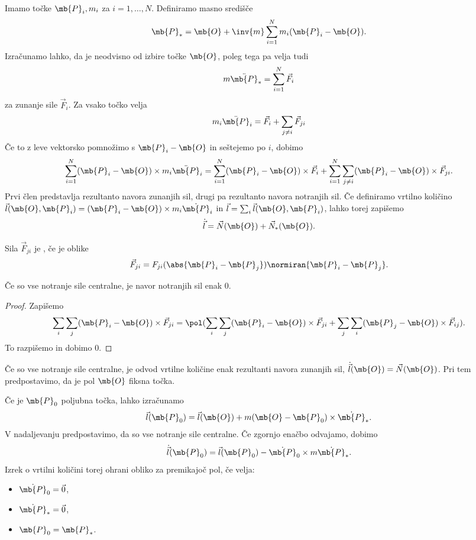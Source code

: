 
Imamo točke $\mb{P}_i, m_i$ za $i = 1, \ldots, N$.
Definiramo masno središče
\[
  \mb{P}_* = \mb{O} + \inv{m} \sum_{i=1}^N m_i (\mb{P}_i - \mb{O}).
\]
Izračunamo lahko, da je neodvisno od izbire točke $\mb{O}$, poleg tega pa velja
tudi
\[
  m \ddot{\mb{P}}_* = \sum_{i=1}^N \vec{F}_i
\]
za zunanje sile $\vec{F}_i$.
Za vsako točko velja
\[
  m_i \ddot{\mb{P}}_i = \vec{F}_i + \sum_{j \ne i} \vec{F}_{ji}
\]
Če to z leve vektorsko pomnožimo s $\mb{P}_i - \mb{O}$ in seštejemo po $i$,
dobimo
\[
  \sum_{i=1}^N (\mb{P}_i - \mb{O}) \times m_i \ddot{\mb{P}}_i
  = \sum_{i=1}^N (\mb{P}_i - \mb{O}) \times \vec{F}_i + \sum_{i=1}^N \sum_{j \ne
  i} (\mb{P}_i - \mb{O}) \times \vec{F}_{ji}.
\]
Prvi člen predstavlja rezultanto navora zunanjih sil, drugi pa rezultanto navora
notranjih sil.
Če definiramo vrtilno količino $\vec{l}(\mb{O}, \mb{P}_i) = (\mb{P}_i - \mb{O})
\times m_i \dot{\mb{P}}_i$ in $\vec{l} = \sum_i \vec{l}(\mb{O}, \mb{P}_i)$,
lahko torej zapišemo
\[
  \dot{\vec{l}} = \vec{N}(\mb{O}) + \vec{N}_*(\mb{O}).
\]

\begin{definicija}
  Sila $\vec{F}_{ji}$ je , če je oblike
  \[
	\vec{F}_{ji} = F_{ji}(\abs{\mb{P}_i - \mb{P}_j}) \normiran{\mb{P}_i -
	  \mb{P}_j}.
  \]
\end{definicija}

\begin{trditev}
  Če so vse notranje sile centralne, je navor notranjih sil enak $0$.
\end{trditev}

\begin{proof}
  Zapišemo
  \[
	\sum_i \sum_j (\mb{P}_i - \mb{O}) \times \vec{F}_{ji}
	= \pol (\sum_i \sum_j (\mb{P}_i - \mb{O}) \times \vec{F}_{ji}
	+ \sum_j \sum_i (\mb{P}_j - \mb{O}) \times \vec{F}_{ij}).
  \]
  To razpišemo in dobimo $0$.
\end{proof}

\begin{izrek}
  Če so vse notranje sile centralne, je odvod vrtilne količine enak rezultanti
  navora zunanjih sil, $\dot{\vec{l}}(\mb{O}) = \vec{N}(\mb{O})$.
  Pri tem predpostavimo, da je pol $\mb{O}$ fiksna točka.
\end{izrek}


Če je $\mb{P}_0$ poljubna točka, lahko izračunamo
\[
  \vec{l}(\mb{P}_0) = \vec{l}(\mb{O}) + m (\mb{O} - \mb{P}_0) \times
  \dot{\mb{P}}_*.
\]
V nadaljevanju predpostavimo, da so vse notranje sile centralne.
Če zgornjo enačbo odvajamo, dobimo
\[
  \dot{\vec{l}}(\mb{P}_0) = \vec{l}(\mb{P}_0) - \dot{\mb{P}}_0 \times m
  \dot{\mb{P}}_*.
\]
Izrek o vrtilni količini torej ohrani obliko za premikajoč pol, če velja:
\begin{itemize}
\item $\dot{\mb{P}}_0 = \vec{0}$,
\item $\dot{\mb{P}}_* = \vec{0}$,
\item $\mb{P}_0 = \mb{P}_*$.
\end{itemize}

